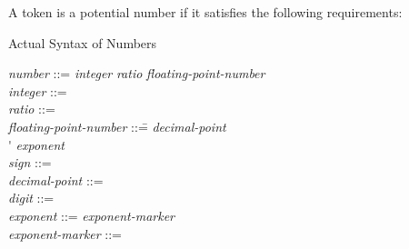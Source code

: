 \goodbreak

A token is a potential number if it satisfies the following
requirements:


\begin{table}[t]
\caption{Actual Syntax of Numbers}
\label{NUMBER-SYNTAX-TABLE}
\tabbingsep=0pt
\normalsize
\begin{tabbing}
\emph{number} ::= \emph{integer} {\Mor} \emph{ratio} {\Mor} \emph{floating-point-number} \\
\emph{integer} ::=    \\
\emph{ratio} ::=   \cdf{/}  \\
\emph{floating-point-number} ::=\=   \emph{decimal-point}   \\
\>{\Mor} \'   \emph{exponent} \\ \emph{sign} ::= \cdf{+} {\Mor} \cdf{-} \\
\emph{decimal-point} ::=  \\
\emph{digit} ::=  {\Mor}  {\Mor}  {\Mor}  {\Mor} 
         {\Mor}  {\Mor}  {\Mor}  {\Mor}  {\Mor}  \\
\emph{exponent} ::= \emph{exponent-marker}   \\
\emph{exponent-marker} ::=  {\Mor}  {\Mor}  {\Mor}  {\Mor} 
                   {\Mor}  {\Mor}  {\Mor}  {\Mor}  {\Mor} 
\end{tabbing}
\end{table}

